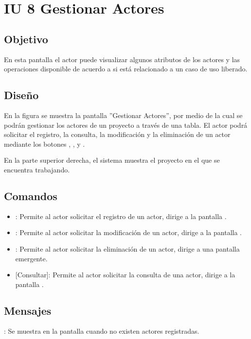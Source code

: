 \section{IU 8 Gestionar Actores}

\subsection{Objetivo}
	En esta pantalla el actor puede visualizar algunos atributos de los actores y las operaciones disponible de acuerdo a si está relacionado a un caso de uso liberado.
\subsection{Diseño}
	En la figura  se muestra la pantalla ''Gestionar Actores'', por medio de la cual se podrán gestionar los actores de un proyecto a través de una tabla. El actor podrá solicitar el registro, la consulta, la modificación y la eliminación de un actor mediante los botones , , \editar y \eliminar.
	
	En la parte superior derecha, el sistema muestra el proyecto en el que se encuentra trabajando.

\subsection{Comandos}
\begin{itemize}
	\item {}: Permite al actor solicitar el registro de un actor, dirige a la pantalla .
	\item \editar [Modificar]: Permite al actor solicitar la modificación de un actor, dirige a la pantalla .
	\item \eliminar [Eliminar]: Permite al actor solicitar la eliminación de un actor, dirige a una pantalla emergente.
	\item {} [Consultar]: Permite al actor solicitar la consulta de una actor, dirige a la pantalla  .
\end{itemize}
\subsection{Mensajes}

\begin{Citemize}
	\item {}: Se muestra en la pantalla  cuando no existen actores registradas.
\end{Citemize}
